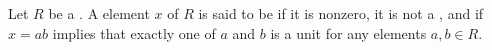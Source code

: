 \begin{definition} \label{definition:irreducible_element_of_a_ring}
    Let $R$ be a . 
    A element $x$ of $R$ is said to be  if it is nonzero, it is not a , and if $x = ab$ implies that exactly one of $a$ and $b$ is a unit for any elements $a,b \in R$.
\end{definition}